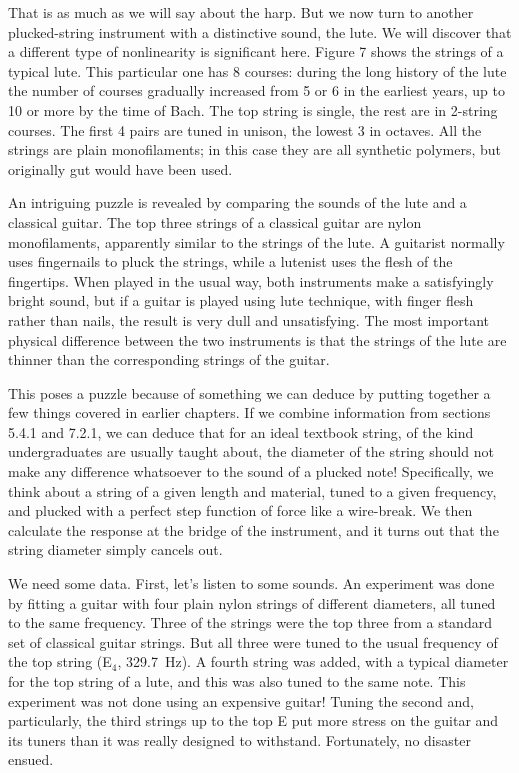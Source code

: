   That is as much as we will say about the harp. But we now turn to another 
  plucked-string instrument with a distinctive sound, the lute. We will 
  discover that a different type of nonlinearity is significant here. Figure 7 
  shows the strings of a typical lute. This particular one has 8 courses: 
  during the long history of the lute the number of courses gradually increased 
  from 5 or 6 in the earliest years, up to 10 or more by the time of Bach. The 
  top string is single, the rest are in 2-string courses. The first 4 pairs are 
  tuned in unison, the lowest 3 in octaves. All the strings are plain 
  monofilaments; in this case they are all synthetic polymers, but originally 
  gut would have been used. 

  An intriguing puzzle is revealed by comparing the sounds of the lute and a 
  classical guitar. The top three strings of a classical guitar are nylon 
  monofilaments, apparently similar to the strings of the lute. A guitarist 
  normally uses fingernails to pluck the strings, while a lutenist uses the 
  flesh of the fingertips. When played in the usual way, both instruments make 
  a satisfyingly bright sound, but if a guitar is played using lute technique, 
  with finger flesh rather than nails, the result is very dull and 
  unsatisfying. The most important physical difference between the two 
  instruments is that the strings of the lute are thinner than the 
  corresponding strings of the guitar. 

  This poses a puzzle because of something we can deduce by putting together a 
  few things covered in earlier chapters. If we combine information from 
  sections 5.4.1 and 7.2.1, we can deduce that for an ideal textbook string, of 
  the kind undergraduates are usually taught about, the diameter of the string 
  should not make any difference whatsoever to the sound of a plucked note! 
  Specifically, we think about a string of a given length and material, tuned 
  to a given frequency, and plucked with a perfect step function of force like 
  a wire-break. We then calculate the response at the bridge of the instrument, 
  and it turns out that the string diameter simply cancels out. 

  We need some data. First, let’s listen to some sounds. An experiment was done 
  by fitting a guitar with four plain nylon strings of different diameters, all 
  tuned to the same frequency. Three of the strings were the top three from a 
  standard set of classical guitar strings. But all three were tuned to the 
  usual frequency of the top string (E$_4$, 329.7~Hz). A fourth string was 
  added, with a typical diameter for the top string of a lute, and this was 
  also tuned to the same note. This experiment was not done using an expensive 
  guitar! Tuning the second and, particularly, the third strings up to the top 
  E put more stress on the guitar and its tuners than it was really designed to 
  withstand. Fortunately, no disaster ensued. 

